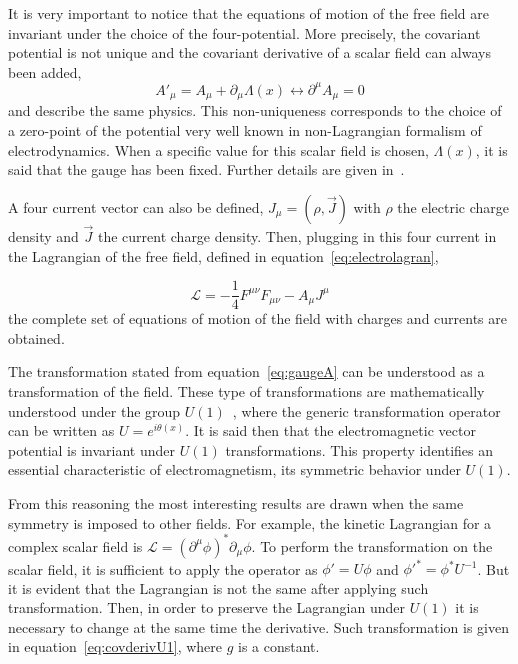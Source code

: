It is very important to notice that the equations of motion of the free field are invariant under the choice of the four-potential. More precisely, the covariant potential is not unique and the covariant derivative of a scalar field can always been added, 
\begin{equation}
  \label{eq:gaugeA}
  {A'}_{\mu}=A_{\mu}+\partial_{\mu}\Lambda(x) \leftrightarrow \partial^{\mu}A_{\mu}=0
\end{equation} and describe the same physics. This non-uniqueness corresponds to the choice of a zero-point of the potential very well known in non-Lagrangian formalism of electrodynamics. When a specific value for this scalar field is chosen, $\Lambda(x)$, it is said that the gauge has been fixed. Further details are given in~\cite{Jackson:1998nia}.

A four current vector can also be defined, $J_{\mu}=\left( \rho,\vec{J} \right)$ with $\rho$ the electric charge density and $\vec{J}$ the current charge density. Then, plugging in this four current in the Lagrangian of the free field, defined in equation~\ref{eq:electrolagran}, 

\begin{equation}
  \label{eq:fulleleclagrangian}
  \mathcal{L}=-\frac{1}{4}F^{\mu\nu}F_{\mu\nu}-A_{\mu}J^{\mu}
\end{equation}the complete set of equations of motion of the field with charges and currents are obtained.

The transformation stated from equation~\ref{eq:gaugeA} can be understood as a transformation of the field. These type of transformations are mathematically understood under the group $U(1)$~\cite{Georgi:1999wka}, where the generic transformation operator can be written as $U=e^{i\theta(x)}$. It is said then that the electromagnetic vector potential is invariant under $U(1)$ transformations. This property identifies an essential characteristic of electromagnetism, its symmetric behavior under $U(1)$. 

From this reasoning the most interesting results are drawn when the same symmetry is imposed to other fields. For example, the kinetic Lagrangian for a complex scalar field is $\mathcal{L}=(\partial^{\mu}\phi)^{*}\partial_{\mu}\phi$. To perform the transformation on the scalar field, it is sufficient to apply the operator as $\phi'=U\phi$ and ${\phi'}^{*}={\phi}^{*} U^{-1}$. But it is evident that the Lagrangian is not the same after applying such transformation. Then, in order to preserve the Lagrangian under $U(1)$ it is necessary to change at the same time the derivative. Such transformation is given in equation~\ref{eq:covderivU1}, where $g$ is a constant.

